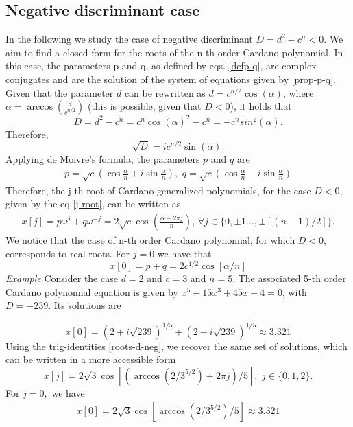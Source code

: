 \documentclass[11pt,reqno]{amsart}
\begin{document}
     \subsection{Negative discriminant case}\label{s: neg-D}
In the following we  study the case of negative  discriminant $D = d^2 - c^n< 0$. We  aim to find a closed form for the roots of the n-th order Cardano polynomial. In this case, the parameters p and q, as defined by eqs. \eqref{defp-q}, are complex conjugates
and are the solution of the system of equations given by \eqref{prop-p-q}.
Given that the parameter $d$ can be rewritten as  $d = c^{n/2}\cos(\alpha)$, where $\alpha = \arccos(\frac{d}{ c^{n/2}})$ (this is  possible,  given that $D<0$),  it holds that $$
D = d^2 - c^n = c^n\cos(\alpha)^2 - c^n =- c^n  sin^2(\alpha).$$
Therefore, \begin{equation}
    \sqrt{D} = i c^{n/2} \sin(\alpha).
\end{equation}
Applying de Moivre's formula, the parameters $p$ and $q$ are
\begin{eqnarray}
    p=\sqrt{c}(\cos \frac{\alpha}{n}+i\sin\frac{\alpha}{n}),\,\,
    q=\sqrt{c}(\cos \frac{\alpha}{n}-i\sin\frac{\alpha}{n})
     \label{p-q-neg}
\end{eqnarray}
Therefore, the j-th root of Cardano generalized polynomials, for the case $D<0$, given by the eq \eqref{j-root}, can be written as
\begin{eqnarray}\label{roots-d-neg}
    x[j]=p\omega^j+q\omega^{-j}=2\sqrt{c}\cos(\frac{\alpha+2\pi j}{n}), \,\forall j\in\{0,\pm 1\ldots,\pm [(n-1)/2]\}.
\end{eqnarray}
We notice that the case of n-th order Cardano polynomial, for which $D<0$, corresponds to real roots.
For $j=0$ we have that
\begin{equation}
x[0] = p + q = 2  c^{1/2}\cos[\alpha/n]
\end{equation}
\textit{Example} 
Consider the case $d = 2$ and $c = 3$ and $n = 5$. The associated 5-th order Cardano polynomial equation is given by
$x^5 - 15x^3 + 45x - 4=0$,
with $D = -239$. Its solutions are

$$x[0] = (2 + i\sqrt{239})^{1/5} + (2 - i\sqrt{239})^{1/5}\approx  3.321 $$
Using the trig-identities \eqref{roots-d-neg}, we recover the same set of solutions, which can be written in a more accessible form
\begin{equation}
x[j] = 2 \sqrt{3}  \cos[(\arccos(2/3^{5/2}) + 2\pi j)/5], \,\, j\in\{0,1,2\}.
\end{equation}
For $j=0,$ we have
\begin{eqnarray}
x[0] = 2 \sqrt{3} \cos[\arccos(2/3^{5/2})/5]\approx 3.321\nonumber
\end{eqnarray}
\end{document}
